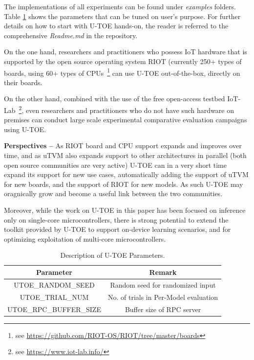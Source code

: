 The implementations of all experiments can be found under \textit{examples} folders. Table \ref{tab:utoe-parameters} shows the parameters that can be tuned on user's purpose. For further details on how to start with U-TOE hands-on, the reader is referred to the comprehensive \textit{Readme.md} in the repository. 

On the one hand, researchers and practitioners who possess IoT hardware that is supported by the open source operating system RIOT (currently 250+ types of boards, using 60+ types of CPUs~\footnote{see \url{https://github.com/RIOT-OS/RIOT/tree/master/boards}} can use U-TOE out-of-the-box, directly on their boards. 

On the other hand, combined with the use of the free open-access testbed IoT-Lab~\footnote{see \url{https://www.iot-lab.info/}}, even researchers and practitioners who do not have such hardware on premises can conduct large scale experimental comparative evaluation campaigns using U-TOE.

{\bf Perspectives --} As RIOT board and CPU support expands and improves over time, and as uTVM also expands support to other architectures in parallel (both open source communities are very active) U-TOE can in a very short time expand its support for new use cases, automatically adding the support of uTVM for new boards, and the support of RIOT for new models. As such U-TOE may oragnically grow and become a useful link between the two communities.

Moreover, while the work on U-TOE in this paper has been focused on inference only on single-core microcontrollers, there is strong potential to extend the toolkit provided by U-TOE to support on-device learning scenarios, and for optimizing exploitation of multi-core microcontrollers.


\begin{table}[]
    \caption{Description of U-TOE Parameters.}
    \label{tab:utoe-parameters}
    \centering
    \begin{tabular}{cc}
    \hline
      Parameter   &  Remark \\\hline
      UTOE\_RANDOM\_SEED    & Random seed for randomized input \\
      UTOE\_TRIAL\_NUM & No. of trials in Per-Model evaluation \\
      UTOE\_RPC\_BUFFER\_SIZE & Buffer size of RPC server \\\hline 
      
    \end{tabular}
    
\end{table}